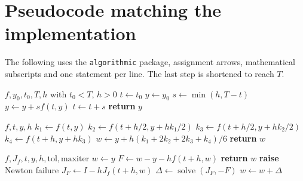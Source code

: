 \documentclass[11pt]{article}
\begin{document}
\section{Pseudocode matching the implementation}
The following uses the \texttt{algorithmic} package, assignment arrows, mathematical
subscripts and one statement per line. The last step is shortened to reach $T$.
\begin{algorithm}[H]
\caption{Explicit Euler with endpoint handling}
\begin{algorithmic}[1]
\REQUIRE $f,y_0,t_0,T,h$ with $t_0<T$, $h>0$
\STATE $t\leftarrow t_0$
\STATE $y\leftarrow y_0$
\STATE $s\leftarrow\min(h,T-t)$
\STATE $y\leftarrow y+s f(t,y)$
\STATE $t\leftarrow t+s$
\ENDWHILE
\STATE \textbf{return} $y$
\end{algorithmic}
\end{algorithm}
\begin{algorithm}[H]
\caption{One classical RK4 step}
\begin{algorithmic}[1]
\REQUIRE $f,t,y,h$
\STATE $k_1\leftarrow f(t,y)$
\STATE $k_2\leftarrow f(t+h/2,y+hk_1/2)$
\STATE $k_3\leftarrow f(t+h/2,y+hk_2/2)$
\STATE $k_4\leftarrow f(t+h,y+hk_3)$
\STATE $w\leftarrow y+h(k_1+2k_2+2k_3+k_4)/6$
\STATE \textbf{return} $w$
\end{algorithmic}
\end{algorithm}
\begin{algorithm}[H]
\caption{Implicit Euler via Newton; residual tolerance $10^{-12}$ A}
\begin{algorithmic}[1]
\REQUIRE $f,J_f,t,y,h,\mathrm{tol},\mathrm{maxiter}$
\STATE $w\leftarrow y$
\STATE $F\leftarrow w-y-h f(t+h,w)$
\STATE \textbf{return} $w$
\ENDIF
{}
\STATE \textbf{raise} Newton failure
\ENDIF
\STATE $J_F\leftarrow I-hJ_f(t+h,w)$
\STATE $\Delta\leftarrow\operatorname{solve}(J_F,-F)$
\STATE $w\leftarrow w+\Delta$
\ENDFOR
\end{algorithmic}
\end{algorithm}
\end{document}
